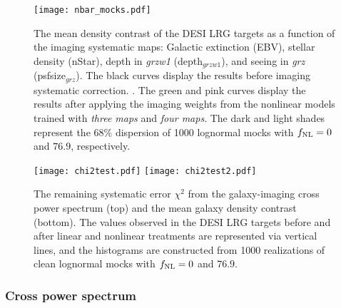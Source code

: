 \begin{figure}
\centering
\texttt{[image: nbar\_mocks.pdf]}
\caption{ The mean density contrast of the DESI LRG targets as a function of the imaging systematic maps: Galactic extinction (EBV), stellar density (nStar), depth in \textit{grzw1} (depth$_{grzw1}$), and seeing in \textit{grz} (psfsize$_{grz}$). The black curves display the results before imaging systematic correction. . The green and pink curves display the results after applying the imaging weights from the nonlinear models trained with \textit{three maps} and \textit{four maps}. The dark and light shades represent the $68\%$ dispersion of 1000 lognormal mocks with $f_{\rm NL}=0$ and $76.9$, respectively.}\label{fig:nbarmock}
\end{figure}


\begin{figure}
\centering
\texttt{[image: chi2test.pdf]}
\texttt{[image: chi2test2.pdf]}
\caption{The remaining systematic error $\chi^{2}$ from the galaxy-imaging cross power spectrum (top) and the mean galaxy density contrast (bottom). The values observed in the DESI LRG targets before and after linear and nonlinear treatments are represented via vertical lines, and the histograms are constructed from 1000 realizations of clean lognormal mocks with $f_{\rm NL}=0$ and $76.9$.}\label{fig:chi2test}
\end{figure}


\subsubsection{Cross power spectrum}


